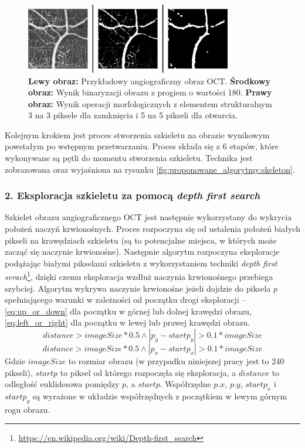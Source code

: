 \begin{figure}[H]
  \centering
  \includegraphics[width=9cm]{gfx/preprocess}
  \caption{\textbf{Lewy obraz:} Przykładowy angiograficzny obraz OCT. \textbf{Środkowy obraz:} Wynik binaryzacji obrazu z progiem o wartości 180. \textbf{Prawy obraz:} Wynik operacji morfologicznych z elementem strukturalnym 3 na 3 piksele dla zamknięcia i 5 na 5 pikseli dla otwarcia.}
  \label{fig:proponowane_algorytmy:preprocess}
\end{figure}

Kolejnym krokiem jest proces stworzenia szkieletu na obrazie wynikowym powstałym po wstępnym przetwarzaniu. Proces składa się z 6 etapów, które wykonywane są pętli do momentu stworzenia szkieletu. Technika jest zobrazowana oraz wyjaśniona na rysunku \ref{fig:proponowane_algorytmy:skeleton}.

\subsubsection{2. Eksploracja szkieletu za pomocą \textit{depth first search}}

Szkielet obrazu angiograficznego OCT jest następnie wykorzystany do wykrycia położeń naczyń krwionośnych. Proces rozpoczyna się od ustalenia położeń białych pikseli na krawędziach szkieletu (są to potencjalne miejsca, w których może zacząć się naczynie krwionośne). Następnie algorytm rozpoczyna eksploracje podążając białymi pikselami szkieletu z wykorzystaniem techniki \textit{depth first serach}\footnote{\url{https://en.wikipedia.org/wiki/Depth-first_search}}, dzięki czemu eksploracja wzdłuż naczynia krwionośnego przebiega szybciej. Algorytm wykrywa naczynie krwionośne jeżeli dojdzie do piksela $p$ spełniającego warunki w zależności od początku drogi eksploracji -- \ref{eq:up_or_down} dla początku w górnej lub dolnej krawędzi obrazu, \ref{eq:left_or_right} dla początku w lewej lub prawej krawędzi obrazu.
\begin{equation}
distance > imageSize * 0.5 \wedge \left|p_{y} - startp_{y}\right| > 0.1 * imageSize
\label{eq:up_or_down}
\end{equation}
\begin{equation}
distance > imageSize * 0.5 \wedge \left|p_{x} - startp_{x}\right| > 0.1 * imageSize
\label{eq:left_or_right}
\end{equation}
Gdzie $imageSize$ to rozmiar obrazu (w przypadku niniejszej pracy jest to 240 pikseli), $startp$ to piksel od którego rozpoczęła się eksploracja, a $distance$ to odległość euklidesowa pomiędzy $p$, a $startp$. Współrzędne $p.x$, $p.y$, $startp_{x}$ i $startp_{y}$ są wyrażone w układzie współrzędnych z początkiem w lewym górnym rogu obrazu.

